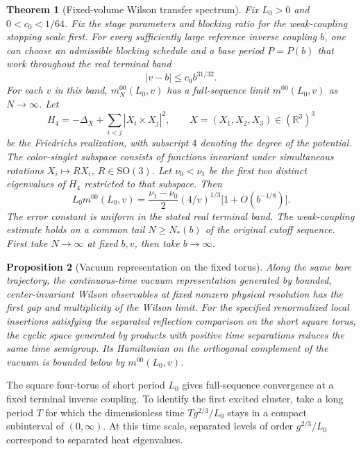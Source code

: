 \documentclass[11pt,a4paper]{article}
\newtheorem{theorem}{Theorem}
\newtheorem{proposition}[theorem]{Proposition}
\numberwithin{equation}{section}
\begin{document}
\begin{theorem}[Fixed-volume Wilson transfer spectrum]
\label{thm:main}
Fix \(L_0>0\) and \(0<c_0<1/64\). Fix the stage parameters and blocking ratio for the weak-coupling stopping scale first. For every sufficiently large reference inverse coupling \(b\), one can choose an admissible blocking schedule and a base period \(P=P(b)\) that work throughout the real terminal band
\[
                   |v-b|\le c_0 b^{31/32}.
\]
For each \(v\) in this band, \(m_N^{00}(L_0,v)\) has a full-sequence limit \(m^{00}(L_0,v)\) as \(N\to\infty\). Let
\[
 H_4=-\Delta_X+\sum_{i<j}|X_i\times X_j|^2,
 \qquad X=(X_1,X_2,X_3)\in(\mathbb R^3)^3
\]
be the Friedrichs realization, with subscript \(4\) denoting the degree of the potential. The color-singlet subspace consists of functions invariant under simultaneous rotations \(X_i\mapsto RX_i\), \(R\in\mathrm{SO}(3)\). Let \(\nu_0<\nu_1\) be the first two distinct eigenvalues of \(H_4\) restricted to that subspace. Then
\begin{equation}
 \label{eq:main}
 L_0 m^{00}(L_0,v)
  =\frac{\nu_1-\nu_0}{2}(4/v)^{1/3}
           \bigl[1+O(b^{-1/8})\bigr].
\end{equation}
The error constant is uniform in the stated real terminal band. The weak-coupling estimate holds on a common tail \(N\ge N_*(b)\) of the original cutoff sequence. First take \(N\to\infty\) at fixed \(b,v\), then take \(b\to\infty\).
\end{theorem}

\begin{proposition}[Vacuum representation on the fixed torus]
\label{prop:representation}
Along the same bare trajectory, the continuous-time vacuum representation generated by bounded, center-invariant Wilson observables at fixed nonzero physical resolution has the first gap and multiplicity of the Wilson limit. For the specified renormalized local insertions satisfying the separated reflection comparison on the short square torus, the cyclic space generated by products with positive time separations reduces the same time semigroup. Its Hamiltonian on the orthogonal complement of the vacuum is bounded below by \(m^{00}(L_0,v)\).
\end{proposition}

The square four-torus of short period \(L_0\) gives full-sequence convergence at a fixed terminal inverse coupling. To identify the first excited cluster, take a long period \(T\) for which the dimensionless time \(Tg^{2/3}/L_0\) stays in a compact subinterval of \((0,\infty)\). At this time scale, separated levels of order \(g^{2/3}/L_0\) correspond to separated heat eigenvalues.
\end{document}
